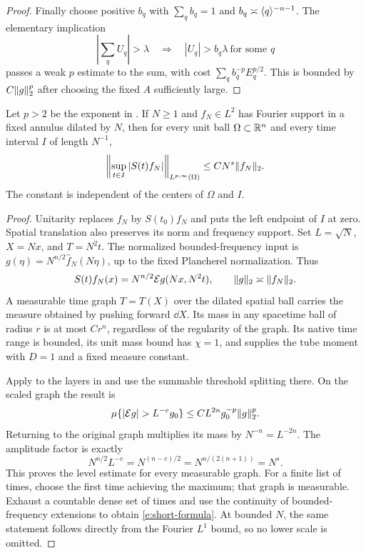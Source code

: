 \begin{proof}
Finally choose positive $b_q$ with $\sum_q b_q=1$ and
$b_q\asymp\langle q\rangle^{-n-1}$.  The elementary implication
\[
 \left|\sum_q U_q\right|>\lambda
       \quad\Longrightarrow\quad
       |U_q|>b_q\lambda\ \text{for some }q
\]
passes a weak $p$ estimate to the sum, with cost
$\sum_q b_q^{-p}E_q^{p/2}$.  This is bounded by $C\lVert g\rVert_2^p$ after
choosing the fixed $A$ sufficiently large.
\end{proof}

\begin{proposition}
\label{e:short-time}
Let $p>2$ be the exponent in .  If $N\ge1$ and $f_N\in L^2$
has Fourier support in a fixed annulus dilated by $N$, then for every
unit ball $\Omega\subset\mathbb R^n$ and every time interval $I$ of length
$N^{-1}$,
\begin{equation}
 \left\|\sup_{t\in I}|S(t)f_N|\right\|_{L^{p,\infty}(\Omega)}
       \le C N^s\lVert f_N\rVert_2.
 \label{e:short-formula}
\end{equation}
The constant is independent of the centers of $\Omega$ and $I$.
\end{proposition}

\begin{proof}
Unitarity replaces $f_N$ by $S(t_0)f_N$ and puts the left endpoint of
$I$ at zero.  Spatial translation also preserves its norm and frequency
support.  Set $L=\sqrt N$, $X=Nx$, and $T=N^2t$.  The normalized
bounded-frequency input is
$g(\eta)=N^{n/2}\widehat f_N(N\eta)$, up to the fixed Plancherel
normalization.  Thus
\[
 S(t)f_N(x)=N^{n/2}\mathcal E g(Nx,N^2t),
 \qquad \lVert g\rVert_2\asymp\lVert f_N\rVert_2.
\]
A measurable time graph $T=T(X)$ over the dilated spatial ball carries
the measure obtained by pushing forward $\dd X$.  Its mass in any
spacetime ball of radius $r$ is at most $C r^n$, regardless of the
regularity of the graph.  Its native time range is bounded, its unit
mass bound has $\chi=1$, and  supplies the tube moment
with $D=1$ and a fixed measure constant.

Apply  to the layers in  and use the
summable threshold splitting there.  On the scaled graph the result is
\[
 \mu\{ |\mathcal E g|>L^{-e}g_0\}
       \le C L^{2n}g_0^{-p}\norm{g}_2^p.
\]
Returning to the original graph multiplies its mass by
$N^{-n}=L^{-2n}$.  The amplitude factor is exactly
\[
 N^{n/2}L^{-e}=N^{(n-e)/2}=N^{n/(2(n+1))}=N^s.
\]
This proves the level estimate for every measurable graph.  For a finite
list of times, choose the first time achieving the maximum; that graph
is measurable.  Exhaust a countable dense set of times and use the
continuity of bounded-frequency extensions to obtain
\eqref{e:short-formula}.  At bounded $N$, the same statement follows
directly from the Fourier $L^1$ bound, so no lower scale is omitted.
\end{proof}


